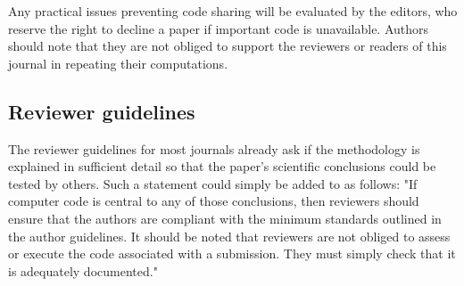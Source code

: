 Any practical issues preventing code sharing will be evaluated by the editors, who reserve the right to decline a paper if important code is unavailable. Authors should note that they are not obliged to support the reviewers or readers of this journal in repeating their computations.

\subsection{Reviewer guidelines}

The reviewer guidelines for most journals already ask if the methodology is explained in sufficient detail so that the paper's scientific conclusions could be tested by others. Such a statement could simply be added to as follows: "If computer code is central to any of those conclusions, then reviewers should ensure that the authors are compliant with the minimum standards outlined in the author guidelines. It should be noted that reviewers are not obliged to assess or execute the code associated with a submission. They must simply check that it is adequately documented."   